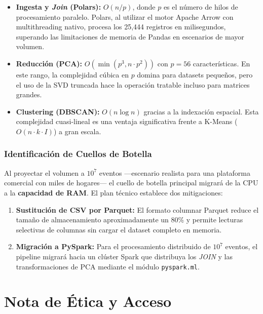 \documentclass[12pt,a4paper]{article}
\newcommand{\code}[1]{\texttt{\small #1}}
\begin{document}
\begin{itemize}
    \item \textbf{Ingesta y \textit{Join} (Polars):} $O(n/p)$, donde $p$ es el número de hilos de procesamiento paralelo. Polars, al utilizar el motor Apache Arrow con multithreading nativo, procesa los 25{,}444 registros en milisegundos, superando las limitaciones de memoria de Pandas en escenarios de mayor volumen.
    \item \textbf{Reducción (PCA):} $O(\min(p^3, n \cdot p^2))$ con $p = 56$ características. En este rango, la complejidad cúbica en $p$ domina para datasets pequeños, pero el uso de la SVD truncada hace la operación tratable incluso para matrices grandes.
    \item \textbf{Clustering (DBSCAN):} $O(n \log n)$ gracias a la indexación espacial. Esta complejidad cuasi-lineal es una ventaja significativa frente a K-Means ($O(n \cdot k \cdot I)$) a gran escala.
\end{itemize}

\subsubsection{Identificación de Cuellos de Botella}

Al proyectar el volumen a $10^7$ eventos —escenario realista para una plataforma comercial con miles de hogares— el cuello de botella principal migrará de la CPU a la \textbf{capacidad de RAM}. El plan técnico establece dos mitigaciones:

\begin{enumerate}
    \item \textbf{Sustitución de CSV por Parquet:} El formato columnar Parquet reduce el tamaño de almacenamiento aproximadamente un 80\% y permite lecturas selectivas de columnas sin cargar el dataset completo en memoria.
    \item \textbf{Migración a PySpark:} Para el procesamiento distribuido de $10^7$ eventos, el pipeline migrará hacia un clúster Spark que distribuya los \textit{JOIN} y las transformaciones de PCA mediante el módulo \code{pyspark.ml}.
\end{enumerate}

\section{Nota de Ética y Acceso}
\end{document}

